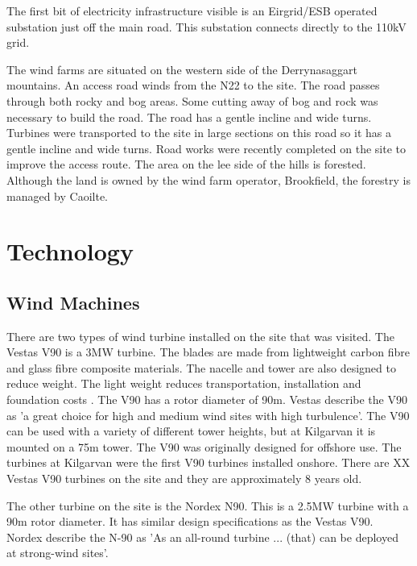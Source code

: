 \documentclass[12pt]{article} %
\begin{document}
The first bit of electricity infrastructure visible is an Eirgrid/ESB operated substation just off the main road. This substation connects directly to the 110kV grid.

The wind farms are situated on the western side of the Derrynasaggart mountains. An access road winds from the N22 to the site. The road passes through both rocky and bog areas. Some cutting away of bog and rock was necessary to build the road. The road has a gentle incline and wide turns. Turbines were transported to the site in large sections on this road so it has a gentle incline and wide turns.
Road works were recently completed on the site to improve the access route.
The area on the lee side of the hills is forested. Although the land is owned by the wind farm operator, Brookfield, the forestry is managed by Caoilte.





\section{Technology}
\subsection{Wind Machines}
There are two types of wind turbine installed on the site that was visited. The Vestas V90 is a 3MW turbine. The blades are made from lightweight carbon fibre and glass fibre composite materials. The nacelle and tower are also designed to reduce weight. The light weight reduces transportation, installation and foundation costs \cite{v90-3.0}. The V90 has a rotor diameter of 90m.
Vestas \cite{v90-3.0} describe the V90 as 'a great choice for high and medium wind sites with high turbulence'. 
The V90 can be used with a variety of different tower heights, but at Kilgarvan it is mounted on a 75m tower. The V90 was originally designed for offshore use. The turbines at Kilgarvan were the first V90 turbines installed onshore.
There are XX Vestas V90 turbines on the site and they are approximately 8 years old.

The other turbine on the site is the Nordex N90. This is a 2.5MW turbine with a 90m rotor diameter. It has similar design specifications as the Vestas V90. Nordex \cite{n90} describe the N-90 as 'As an all-round turbine ... (that) can be deployed at strong-wind sites'.
\end{document}
